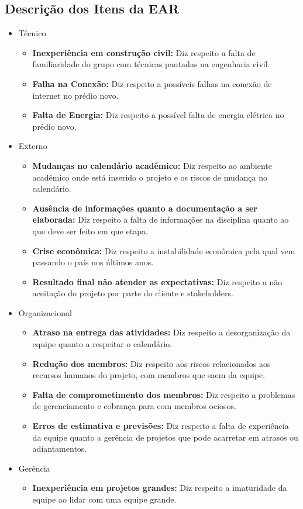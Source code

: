 \subsection{Descrição dos Itens da EAR}
\begin{itemize}
  \item Técnico
    \begin{itemize}
      \item \textbf{Inexperiência em construção civil:} Diz respeito a falta de familiaridade do grupo com técnicas pautadas na engenharia civil.
      \item \textbf{Falha na Conexão:} Diz respeito a possíveis falhas na conexão de internet no prédio novo.
      \item \textbf{Falta de Energia:} Diz respeito a possível falta de energia elétrica no prédio novo.
    \end{itemize}
  \item Externo
  \begin{itemize}
    \item \textbf{Mudanças no calendário acadêmico:} Diz respeito ao ambiente acadêmico onde está inserido o projeto e os riscos de mudança no calendário.
    \item \textbf{Ausência de informações quanto a documentação a ser elaborada:} Diz respeito a falta de informações na disciplina quanto ao que deve ser feito em que etapa.
    \item \textbf{Crise econômica:} Diz respeito a instabilidade econômica pela qual vem passando o país nos últimos anos.
    \item \textbf{Resultado final não atender as expectativas:} Diz respeito a não aceitação do projeto por parte do cliente e stakeholders.
  \end{itemize}


  \item Organizacional
  \begin{itemize}
    \item \textbf{Atraso na entrega das atividades:} Diz respeito a desorganização da equipe quanto a respeitar o calendário.
    \item \textbf{Redução dos membros:} Diz respeito aos riscos relacionados aos recursos humanos do projeto, com membros que saem da equipe.
    \item \textbf{Falta de comprometimento dos membros:} Diz respeito a problemas de gerenciamento e cobrança para com membros ociosos.
    \item \textbf{Erros de estimativa e previsões:} Diz respeito a falta de experiência da equipe quanto a gerência de projetos que pode acarretar em atrasos ou adiantamentos.
  \end{itemize}

  \item Gerência
  \begin{itemize}
    \item \textbf{Inexperiência em projetos grandes:} Diz respeito a imaturidade da equipe ao lidar com uma equipe grande.
  \end{itemize}

\end{itemize}


